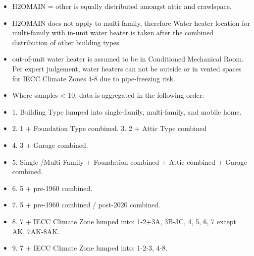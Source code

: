 \begin{itemize}
\item H2OMAIN = other is equally distributed amongst attic and crawlspace.
\item H2OMAIN does not apply to multi-family, therefore Water heater location for multi-family with in-unit water heater is taken after the combined distribution of other building types.
\item out-of-unit water heater is assumed to be in Conditioned Mechanical Room. Per expert judgement, water heaters can not be outside or in vented spaces for IECC Climate Zones 4-8 due to pipe-freezing risk.
\item Where samples < 10, data is aggregated in the following order:
\item 1. Building Type lumped into single-family, multi-family, and mobile home.
\item 2. 1 + Foundation Type combined. 3. 2 + Attic Type combined
\item 4. 3 + Garage combined.
\item 5. Single-/Multi-Family + Foundation combined + Attic combined + Garage combined.
\item 6. 5 + pre-1960 combined.
\item 7. 5 + pre-1960 combined / post-2020 combined.
\item 8. 7 + IECC Climate Zone lumped into: 1-2+3A, 3B-3C, 4, 5, 6, 7 except AK, 7AK-8AK.
\item 9. 7 + IECC Climate Zone lumped into: 1-2-3, 4-8.
\end{itemize}
